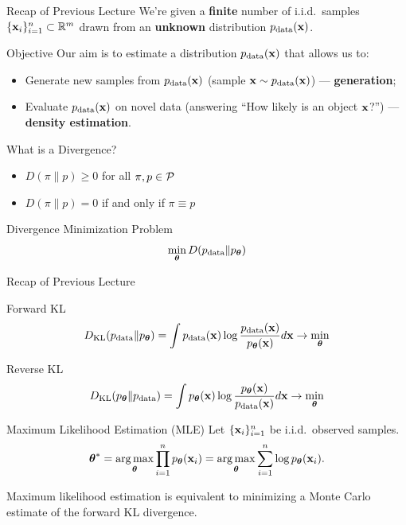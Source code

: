 \documentclass{beamer}
\begin{document}
\begin{frame}
\titlepage
\resetonslide
\end{frame}
\begin{frame}{Recap of Previous Lecture}
	We're given a \textbf{finite} number of i.i.d.\ samples $\{\mathbf{x}_i\}_{i=1}^n \subset \mathbb{R}^m$ drawn from an \textbf{unknown} distribution $p_{\text{data}}(\mathbf{x})$.
	\begin{block}{Objective}
		Our aim is to estimate a distribution $p_{\text{data}}(\mathbf{x})$ that allows us to: 
		\begin{itemize}
		    \item Generate new samples from $p_{\text{data}}(\mathbf{x})$ (sample $\mathbf{x} \sim p_{\text{data}}(\mathbf{x})$) --- \textbf{generation};		    
		    \item Evaluate $p_{\text{data}}(\mathbf{x})$ on novel data (answering ``How likely is an object $\mathbf{x}$?'') --- \textbf{density estimation}. 
		\end{itemize}
	\end{block}

	\begin{block}{What is a Divergence?}
		\begin{itemize}
			\item $D(\pi \| p) \geq 0$ for all $\pi, p \in \mathcal{P}$
			\item $D(\pi \| p) = 0$ if and only if $\pi \equiv p$
		\end{itemize}
	\end{block}
	\vspace{-0.1cm}
	\begin{block}{Divergence Minimization Problem}
		\vspace{-0.3cm}
		\[
		\min_{\boldsymbol{\theta}} D(p_{\text{data}} \| p_{\boldsymbol{\theta}})
		\]
		\vspace{-0.5cm}
	\end{block}
\end{frame}
\begin{frame}{Recap of Previous Lecture}
	\begin{block}{Forward KL}
		\vspace{-0.2cm}
		\[
		D_\mathrm{KL}(p_{\text{data}} \| p_{\boldsymbol{\theta}}) = \int p_{\text{data}}(\mathbf{x}) \log \frac{p_{\text{data}}(\mathbf{x})}{p_{\boldsymbol{\theta}}(\mathbf{x})} d \mathbf{x} \rightarrow \min_{\boldsymbol{\theta}}
		\]
	\end{block}
	\begin{block}{Reverse KL}
		\vspace{-0.2cm}
		\[
		D_\mathrm{KL}(p_{\boldsymbol{\theta}} \| p_{\text{data}}) = \int p_{\boldsymbol{\theta}}(\mathbf{x}) \log \frac{p_{\boldsymbol{\theta}}(\mathbf{x})}{p_{\text{data}}(\mathbf{x})} d \mathbf{x} \rightarrow \min_{\boldsymbol{\theta}}
		\]
	\end{block}

	\begin{block}{Maximum Likelihood Estimation (MLE)}
	Let $\{\mathbf{x}_i\}_{i=1}^n$ be i.i.d.\ observed samples.
		\vspace{-0.3cm}
		\[
		\boldsymbol{\theta}^* = \operatorname*{arg\,max}_{\boldsymbol{\theta}} \prod_{i=1}^n p_{\boldsymbol{\theta}}(\mathbf{x}_i) = \operatorname*{arg\,max}_{\boldsymbol{\theta}} \sum_{i=1}^n \log p_{\boldsymbol{\theta}}(\mathbf{x}_i).
		\]
		\vspace{-0.1cm}
	\end{block}
	Maximum likelihood estimation is equivalent to minimizing a Monte Carlo estimate of the forward KL divergence.
\end{frame}
\end{document}
